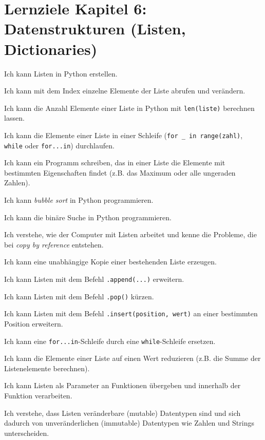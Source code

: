 \section{Lernziele Kapitel 6: Datenstrukturen (Listen, Dictionaries)}

\begin{todolist}
    \item Ich kann Listen in Python erstellen.
    \item Ich kann mit dem Index einzelne Elemente der Liste abrufen und verändern.
    \item Ich kann die Anzahl Elemente einer Liste in Python mit \lstinline|len(liste)| berechnen lassen.
    \item Ich kann die Elemente einer Liste in einer Schleife (\lstinline|for _ in range(zahl)|, \lstinline|while| oder \lstinline|for...in|) durchlaufen.
    \item Ich kann ein Programm schreiben, das in einer Liste die Elemente mit bestimmten Eigenschaften findet (z.B. das Maximum oder alle ungeraden Zahlen).
    \item Ich kann \textit{bubble sort} in Python programmieren.
    \item Ich kann die binäre Suche in Python programmieren.
    \item Ich verstehe, wie der Computer mit Listen arbeitet und kenne die Probleme, die bei \textit{copy by reference} entstehen.
    \item Ich kann eine unabhängige Kopie einer bestehenden Liste erzeugen.
    \item Ich kann Listen mit dem Befehl \lstinline|.append(...)| erweitern.
    \item Ich kann Listen mit dem Befehl \lstinline|.pop()| kürzen.
    \item Ich kann Listen mit dem Befehl \lstinline|.insert(position, wert)| an einer bestimmten Position erweitern.
    \item Ich kann eine \lstinline|for...in|-Schleife durch eine \lstinline|while|-Schleife ersetzen.
    \item Ich kann die Elemente einer Liste auf einen Wert reduzieren (z.B. die Summe der Listenelemente berechnen).
    \item Ich kann Listen als Parameter an Funktionen übergeben und innerhalb der Funktion verarbeiten.
    \item Ich verstehe, dass Listen veränderbare (mutable) Datentypen sind und sich dadurch von unveränderlichen (immutable) Datentypen wie Zahlen und Strings unterscheiden.

\end{todolist}

